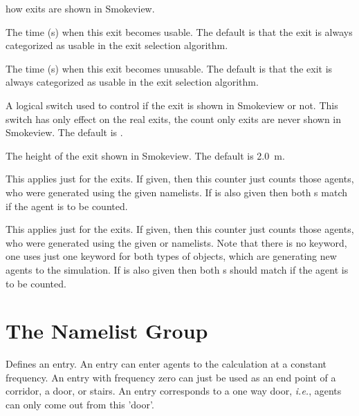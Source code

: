 \documentclass[12pt,a4paper,final,twoside]{stylevk}
\begin{document}
\begin{description}
  how exits are shown in Smokeview.
%
\item[\Timts{TIME\_OPEN}] The time (s) when this exit becomes usable.
  The default is that the exit is always categorized as usable in the
  exit selection algorithm.
%
\item[\Timts{TIME\_CLOSE}] The time (s) when this exit becomes
  unusable.  The default is that the exit is always categorized as
  usable in the exit selection algorithm.
%
\item[\Timts{SHOW}] A logical switch used to control if the exit is
  shown in Smokeview or not.  This switch has only effect on the real
  exits, the count only exits are never shown in Smokeview.  The
  default is .
%
\item[\Timts{HEIGHT}] The height of the exit shown in Smokeview.  The
  default is 2.0~m.
%
\item[\Timts{PERS\_ID}] This applies just for the  exits.  If given, then this counter just counts those
  agents, who were generated using the given  namelists.
  If  is also given then both s match if the agent
  is to be counted.
%
\item[\Timts{EVAC\_ID}] This applies just for the  exits.  If given, then this counter just counts those
  agents, who were generated using the given  or
   namelists.  Note that there is no 
  keyword, one uses just one keyword for both types of objects, which
  are generating new agents to the simulation.  If  is
  also given then both s should match if the agent is to be counted.
%
\end{description}


\section{The  Namelist Group}\label{Sec_EntrNML}

\noindent Defines an entry.  An entry can enter agents to the
calculation at a constant frequency.  An entry with frequency zero can
just be used as an end point of a corridor, a door, or stairs.  An
entry corresponds to a one way door, \emph{i.e.}, agents can only come
out from this 'door'.
\end{document}
